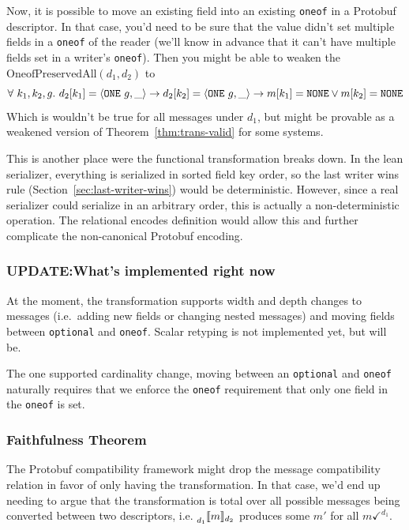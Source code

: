 Now, it is possible to move an existing field into an existing \texttt{oneof} in
a Protobuf descriptor. In that case, you'd need to be sure that the value didn't
set multiple fields in a \texttt{oneof} of the reader (we'll know in advance
that it can't have multiple fields set in a writer's \texttt{oneof}). Then you
might be able to weaken the $\mathrm{OneofPreservedAll}(d_1, d_2)$ to 
\[ \forall\ k_1, k_2, g.\ d_2[k_1] = \langle \texttt{ONE}\ g, \_ \rangle \rightarrow d_2[k_2] = \langle \texttt{ONE}\ g, \_ \rangle \to
  m[k_1] = \mathtt{NONE} \vee m[k_2] = \mathtt{NONE} \]
Which is wouldn't be true for all messages under $d_1$, but might be provable
as a weakened version of Theorem~\ref{thm:trans-valid} for some systems.

{\color{red} This is another place were the functional transformation breaks
  down. In the lean serializer, everything is serialized in sorted field key
  order, so the last writer wins rule (Section~\ref{sec:last-writer-wins}) would
  be deterministic. However, since a real serializer could serialize in an
  arbitrary order, this is actually a non-deterministic operation. The
  relational encodes definition would allow this and further complicate the
  non-canonical Protobuf encoding.}

\subsubsection{UPDATE:\@ What's implemented right now}

At the moment, the transformation supports width and depth changes to messages
(i.e.\ adding new fields or changing nested messages) and moving fields between
\texttt{optional} and \texttt{oneof}. Scalar retyping is not implemented yet,
but will be.

The one supported cardinality change, moving between an \texttt{optional} and
\texttt{oneof} naturally requires that we enforce the \texttt{oneof} requirement
that only one field in the \texttt{oneof} is set.

\subsubsection{Faithfulness Theorem}

The Protobuf compatibility framework might drop the message compatibility
relation in favor of only having the transformation. In that case, we'd end up
needing to argue that the transformation is total over all possible messages
being converted between two descriptors, i.e. $\prescript{}{d_1}{\llbracket{} m \rrbracket{}}_{d_2}$ produces
some $m'$ for all $m \checkmark^{d_1}$.

